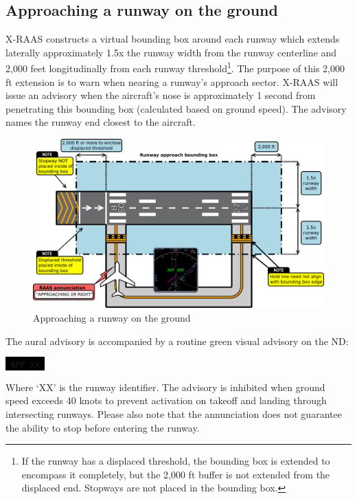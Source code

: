 \documentclass[a4paper,12pt]{article}
\newcommand{\visualadvisory}[3][b]{%
    \ifthenelse{\equal{#1}{b}}{\begin{center}}{}
    \noindent
    \colorbox{black}{\textcolor{#2visualadvisorycolor}{\large\texttt{~#3~}}}
    \ifthenelse{\equal{#1}{b}}{\end{center}}{}}
\begin{document}
\subsection{Approaching a runway on the ground}
\label{subsec:ApchGndMon}

X-RAAS constructs a virtual bounding box around each runway which extends
laterally approximately 1.5x the runway width from the runway centerline
and 2,000 feet longitudinally from each runway threshold\footnote{If the
runway has a displaced threshold, the bounding box is extended to
encompass it completely, but the 2,000 ft buffer is not extended from the
displaced end. Stopways are not placed in the bounding box.}. The purpose
of this 2,000 ft extension is to warn when nearing a runway's approach
sector. X-RAAS will issue an advisory when the aircraft's nose is
approximately 1 second from penetrating this bounding box (calculated
based on ground speed). The advisory names the runway end closest to the
aircraft.

\begin{figure}[H]
\begin{center}
\includegraphics[width=\textwidth]{../src/apch.pdf}
\end{center}
\caption{Approaching a runway on the ground}
\end{figure}

\noindent The aural advisory is accompanied by a routine green visual
advisory on the ND:

\visualadvisory{routine}{APP XX}

\noindent Where `XX' is the runway identifier. The advisory is inhibited
when ground speed exceeds 40 knots to prevent activation on takeoff and
landing through intersecting runways. Please also note that the
annunciation does not guarantee the ability to stop before entering the
runway.
\end{document}
